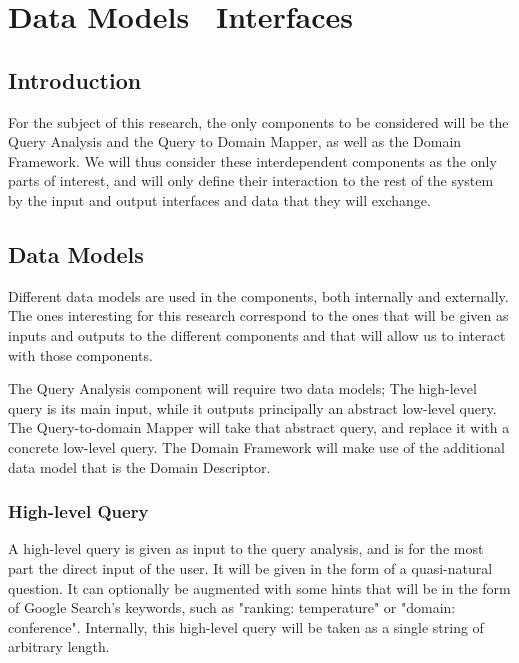 \chapter{Data Models \amper\ Interfaces} %
\label{cha:data_models_interfaces}

\section{Introduction} %
\label{sec:introduction_data_models}

For the subject of this research, the only components to be considered will be the Query Analysis and the Query to Domain Mapper, as well as the Domain Framework. We will thus consider these interdependent components as the only parts of interest, and will only define their interaction to the rest of the system by the input and output interfaces and data that they will exchange.


\section{Data Models} %
\label{sec:data_models}
Different data models are used in the components, both internally and externally. The ones interesting for this research correspond to the ones that will be given as inputs and outputs to the different components and that will allow us to interact with those components.

The Query Analysis component will require two data models; The high-level query is its main input, while it outputs principally an abstract low-level query. The Query-to-domain Mapper will take that abstract query, and replace it with a concrete low-level query. The Domain Framework will make use of the additional data model that is the Domain Descriptor.

\subsection{High-level Query} %
\label{sub:high_level_query}

A high-level query is given as input to the query analysis, and is for the most part the direct input of the user. It will be given in the form of a quasi-natural question. It can optionally be augmented with some hints that will be in the form of Google Search's keywords, such as "ranking: temperature" or "domain: conference". Internally, this high-level query will be taken as a single string of arbitrary length.

